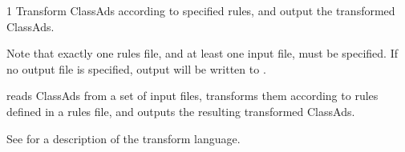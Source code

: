 \begin{ManPage}{\label{man-condor-transform-ads}}{1}
{Transform ClassAds according to specified rules, and output the transformed
ClassAds.}

\Synopsis
{}


Note that exactly one rules file, and at least one input file, must
be specified.  If no output file is specified, output will be written
to .

\Description

 reads ClassAds from a set of input files,
transforms them according to rules defined in a rules file, and outputs
the resulting transformed ClassAds.

See
for a description of the transform language.


\end{ManPage}
